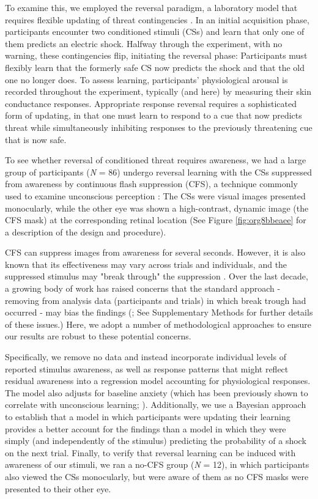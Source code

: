 \documentclass[12pt]{article}
\begin{document}
To examine this, we employed the reversal paradigm, a laboratory model
that requires flexible updating of threat contingencies
\cite{Schiller2008}. In an initial acquisition phase, participants
encounter two conditioned stimuli (CSs) and learn that only one of them
predicts an electric shock. Halfway through the experiment, with no
warning, these contingencies flip, initiating the reversal phase:
Participants must flexibly learn that the formerly safe CS now predicts
the shock and that the old one no longer does. To assess learning,
participants' physiological arousal is recorded throughout the
experiment, typically (and here) by measuring their skin conductance
responses. Appropriate response reversal requires a sophisticated form
of updating, in that one must learn to respond to a cue that now
predicts threat while simultaneously inhibiting responses to the
previously threatening cue that is now safe.

To see whether reversal of conditioned threat requires awareness, we had
a large group of participants (\emph{N} = 86)
undergo reversal learning with the CSs suppressed from awareness by
continuous flash suppression (CFS), a technique commonly used to examine
unconscious perception
\cite{Raio2012,Tsuchiya2005,Stein2011,Carmel2010}: The CSs were visual
images presented monocularly, while the other eye was shown a
high-contrast, dynamic image (the CFS mask) at the corresponding retinal
location (See Figure \ref{fig:org8bbeaee} for a description of the design and
procedure).

CFS can suppress images from awareness for several seconds. However, it
is also known that its effectiveness may vary across trials and
individuals, and the suppressed stimulus may "break through" the
suppression \cite{Gayet2017}. Over the last decade, a growing body of
work has raised concerns that the standard approach - removing from
analysis data (participants and trials) in which break trough had
occurred - may bias the findings (\cite{Shanks2016,Stein2014a}; See
Supplementary Methods for further details of these issues.) Here, we
adopt a number of methodological approaches to ensure our results are
robust to these potential concerns.

Specifically, we remove no data and instead incorporate individual
levels of reported stimulus awareness, as well as response patterns that
might reflect residual awareness into a regression model accounting for
physiological responses. The model also adjusts for baseline anxiety
(which has been previously shown to correlate with unconscious learning;
\cite{Raio2012}). Additionally, we use a Bayesian approach to
establish that a model in which participants were updating their
learning provides a better account for the findings than a model in
which they were simply (and independently of the stimulus) predicting
the probability of a shock on the next trial. Finally, to verify that
reversal learning can be induced with awareness of our stimuli, we ran a
no-CFS group (\emph{N} = 12),
in which participants also viewed the CSs monocularly, but were aware of
them as no CFS masks were presented to their other eye.
\end{document}
